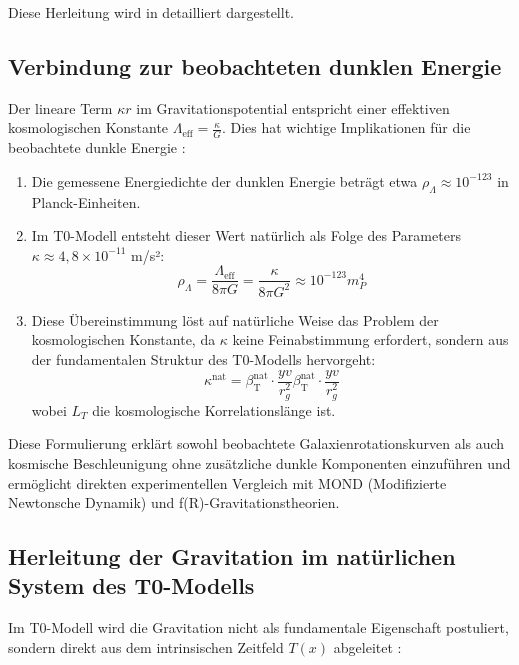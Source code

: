\documentclass[12pt,a4paper]{article}
\newcommand{\betaT}{\beta_{\text{T}}}
\begin{document}
Diese Herleitung wird in \cite{pascher_emergente_gravitation_2025} detailliert dargestellt.

\subsection*{Verbindung zur beobachteten dunklen Energie}

Der lineare Term $\kappa r$ im Gravitationspotential entspricht einer effektiven kosmologischen Konstante $\Lambda_{\text{eff}} = \frac{\kappa}{G}$. Dies hat wichtige Implikationen für die beobachtete dunkle Energie \cite{pascher_energiedynamik_2025}:

\begin{enumerate}
	\item Die gemessene Energiedichte der dunklen Energie beträgt etwa $\rho_\Lambda \approx 10^{-123}$ in Planck-Einheiten.
	
	\item Im T0-Modell entsteht dieser Wert natürlich als Folge des Parameters $\kappa \approx 4,8 \times 10^{-11}$ m/s²:
	\[
	\rho_\Lambda = \frac{\Lambda_{\text{eff}}}{8\pi G} = \frac{\kappa}{8\pi G^2} \approx 10^{-123} m_P^4
	\]
	
	\item Diese Übereinstimmung löst auf natürliche Weise das Problem der kosmologischen Konstante, da $\kappa$ keine Feinabstimmung erfordert, sondern aus der fundamentalen Struktur des T0-Modells hervorgeht:
	\[
	\kappa^{\text{nat}} = \betaT^{\text{nat}} \cdot \frac{yv}{r_g^2}\betaT^{\text{nat}} \cdot \frac{yv}{r_g^2}
	\]
	wobei $L_T$ die kosmologische Korrelationslänge ist.
\end{enumerate}

Diese Formulierung erklärt sowohl beobachtete Galaxienrotationskurven als auch kosmische Beschleunigung ohne zusätzliche dunkle Komponenten einzuführen und ermöglicht direkten experimentellen Vergleich mit MOND (Modifizierte Newtonsche Dynamik) und f(R)-Gravitationstheorien.

\subsection*{Herleitung der Gravitation im natürlichen System des T0-Modells}

Im T0-Modell wird die Gravitation nicht als fundamentale Eigenschaft postuliert, sondern direkt aus dem intrinsischen Zeitfeld $T(x)$ abgeleitet \cite{pascher_emergente_gravitation_2025}:
\end{document}

